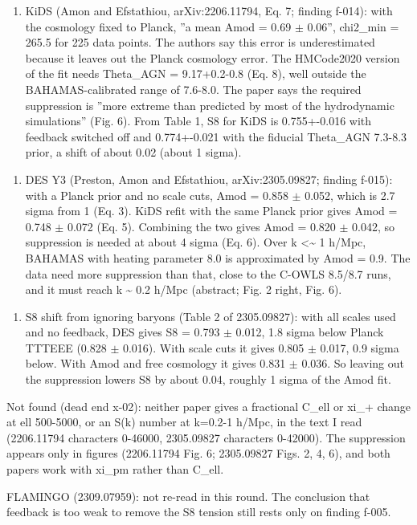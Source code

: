 \documentclass[11pt,a4paper]{article}
\begin{document}
\begin{enumerate}
  \item KiDS (Amon and Efstathiou, arXiv:2206.11794, Eq. 7; finding f-014): with the cosmology fixed to Planck, ''a mean Amod = 0.69 $\pm$ 0.06'', chi2\_min = 265.5 for 225 data points. The authors say this error is underestimated because it leaves out the Planck cosmology error. The HMCode2020 version of the fit needs Theta\_AGN = 9.17+0.2-0.8 (Eq. 8), well outside the BAHAMAS-calibrated range of 7.6-8.0. The paper says the required suppression is ''more extreme than predicted by most of the hydrodynamic simulations'' (Fig. 6). From Table 1, S8 for KiDS is 0.755+-0.016 with feedback switched off and 0.774+-0.021 with the fiducial Theta\_AGN 7.3-8.3 prior, a shift of about 0.02 (about 1 sigma).
\end{enumerate}
\begin{enumerate}
  \item DES Y3 (Preston, Amon and Efstathiou, arXiv:2305.09827; finding f-015): with a Planck prior and no scale cuts, Amod = 0.858 $\pm$ 0.052, which is 2.7 sigma from 1 (Eq. 3). KiDS refit with the same Planck prior gives Amod = 0.748 $\pm$ 0.072 (Eq. 5). Combining the two gives Amod = 0.820 $\pm$ 0.042, so suppression is needed at about 4 sigma (Eq. 6). Over k \textless{}\textasciitilde{} 1 h/Mpc, BAHAMAS with heating parameter 8.0 is approximated by Amod = 0.9. The data need more suppression than that, close to the C-OWLS 8.5/8.7 runs, and it must reach k \textasciitilde{} 0.2 h/Mpc (abstract; Fig. 2 right, Fig. 6).
\end{enumerate}
\begin{enumerate}
  \item S8 shift from ignoring baryons (Table 2 of 2305.09827): with all scales used and no feedback, DES gives S8 = 0.793 $\pm$ 0.012, 1.8 sigma below Planck TTTEEE (0.828 $\pm$ 0.016). With scale cuts it gives 0.805 $\pm$ 0.017, 0.9 sigma below. With Amod and free cosmology it gives 0.831 $\pm$ 0.036. So leaving out the suppression lowers S8 by about 0.04, roughly 1 sigma of the Amod fit.
\end{enumerate}
Not found (dead end x-02): neither paper gives a fractional C\_ell or xi\_+ change at ell 500-5000, or an S(k) number at k=0.2-1 h/Mpc, in the text I read (2206.11794 characters 0-46000, 2305.09827 characters 0-42000). The suppression appears only in figures (2206.11794 Fig. 6; 2305.09827 Figs. 2, 4, 6), and both papers work with xi\_pm rather than C\_ell.

FLAMINGO (2309.07959): not re-read in this round. The conclusion that feedback is too weak to remove the S8 tension still rests only on finding f-005.
\end{document}
